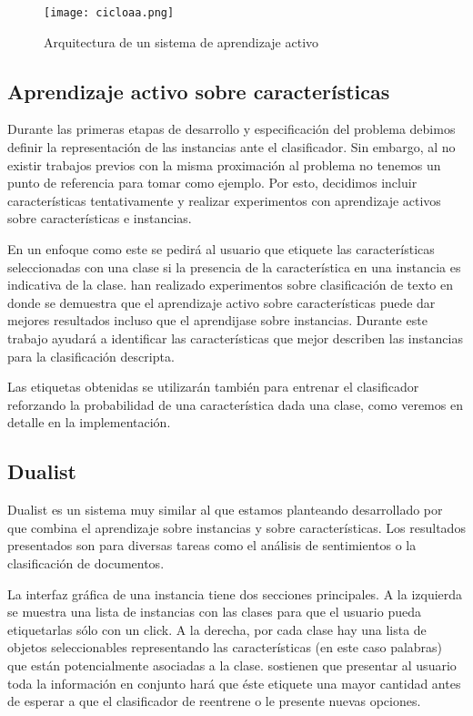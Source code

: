 \begin{figure}[h]
\caption{Arquitectura de un sistema de aprendizaje activo}
\texttt{[image: cicloaa.png]}
\centering
\end{figure}

\subsection{Aprendizaje activo sobre características}

Durante las primeras etapas de desarrollo y especificación del problema debimos definir la representación de las instancias ante el clasificador. Sin embargo, al no existir trabajos previos con la misma proximación al problema no tenemos un punto de referencia para tomar como ejemplo. Por esto, decidimos incluir características tentativamente y realizar experimentos con aprendizaje activos sobre características e instancias.


En un enfoque como este se pedirá al usuario que etiquete las características seleccionadas con una clase si la presencia de la característica en una instancia es indicativa de la clase. \citet{settles-al-features} han realizado experimentos sobre clasificación de texto en donde se demuestra que el aprendizaje activo sobre características puede dar mejores resultados incluso que el aprendijase sobre instancias. Durante este trabajo ayudará a identificar las características que mejor describen las instancias para la clasificación descripta.

Las etiquetas obtenidas se utilizarán también para entrenar el clasificador reforzando la probabilidad de una característica dada una clase, como veremos en detalle en la implementación.

\subsection{Dualist}

Dualist es un sistema muy similar al que estamos planteando desarrollado por \citet{dualist} que combina el aprendizaje sobre instancias y sobre características. Los resultados presentados son para diversas tareas como el análisis de sentimientos o la clasificación de documentos.

La interfaz gráfica de una instancia tiene dos secciones principales. A la izquierda se muestra una lista de instancias con las clases para que el usuario pueda etiquetarlas sólo con un click. A la derecha, por cada clase hay una lista de objetos seleccionables representando las características (en este caso palabras) que están potencialmente asociadas a la clase. \citet{dualist} sostienen que presentar al usuario toda la información en conjunto hará que éste etiquete una mayor cantidad antes de esperar a que el clasificador de reentrene o le presente nuevas opciones.

